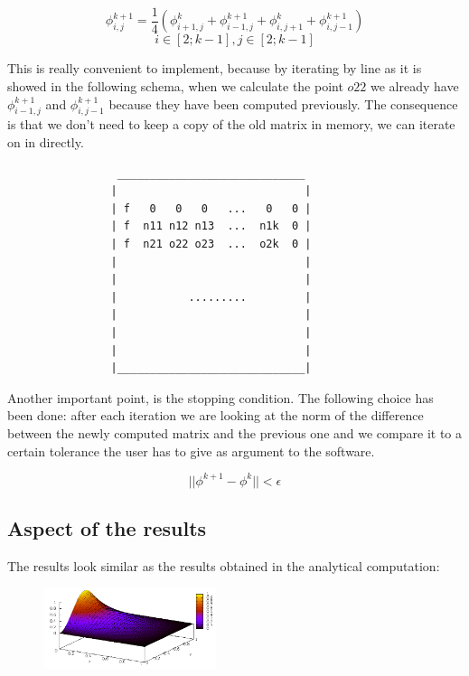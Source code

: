\documentclass[a4paper,11pt]{article}
\begin{document}
$$\phi^{k+1}_{i,j} = \frac{1}{4}(\phi^{k}_{i+1,j} + \phi^{k+1}_{i-1,j} + \phi^{k}_{i,j+1} + \phi^{k+1}_{i,j-1})$$
$$i \in [2;k-1], j \in [2;k-1]$$

This is really convenient to implement, because by iterating by line as it is showed in the following schema, when
we calculate the point $o22$ we already have $\phi^{k+1}_{i-1,j}$ and $\phi^{k+1}_{i,j-1}$ because they have been
computed previously. The consequence is that we don't need to keep a copy of the old matrix in memory, we can iterate
on in directly.
  
\begin{verbatim}
                 _____________________________
                |                             |
                | f   0   0   0   ...   0   0 |
                | f  n11 n12 n13  ...  n1k  0 |
                | f  n21 o22 o23  ...  o2k  0 |
                |                             |
                |                             |
                |           .........         |
                |                             |
                |                             |
                |                             |
                |_____________________________|
\end{verbatim}

Another important point, is the stopping condition. The following choice has been done: after each iteration we are looking
at the norm of the difference between the newly computed matrix and the previous one and we compare it to a certain tolerance
the user has to give as argument to the software.

\[
  ||\phi^{k+1} - \phi^{k}|| < \epsilon
\]

\subsection{Aspect of the results}

The results look similar as the results obtained in the analytical computation:

\begin{figure}[h!]
  \centering
  \includegraphics[width=0.45\textwidth]{images/serial-results.png}
\end{figure}
\end{document}

